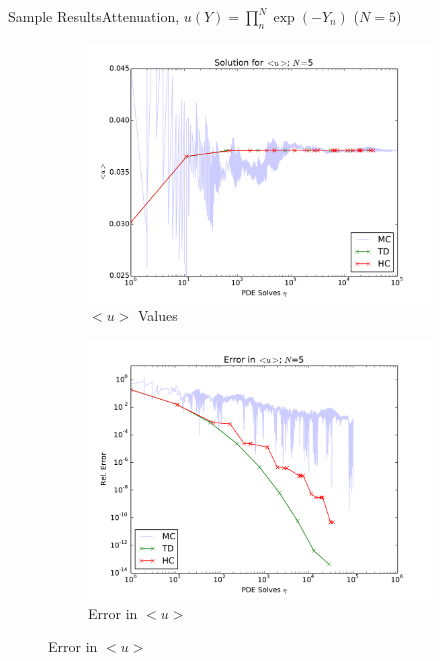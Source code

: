 \documentclass{beamer}
\begin{document}
\begin{frame}{Sample Results}{Attenuation,  $u(Y)=\prod_n^N \exp(-Y_n)$ ($N=5$)}
  \begin{figure}[h!]
    \centering
    \begin{subfigure}[b]{0.49 \textwidth}
      \includegraphics[width=\textwidth]{../graphics/attenuate_N5_soln}
      \caption{$<u>$ Values}
      \label{err_5}
    \end{subfigure}
    \begin{subfigure}[b]{0.49 \textwidth}
      \includegraphics[width=\textwidth]{../graphics/attenuate_N5_conv}
      \caption{Error in $<u>$}
      \label{err_14}
    \end{subfigure}
  \end{figure}
\end{frame}
\end{document}
